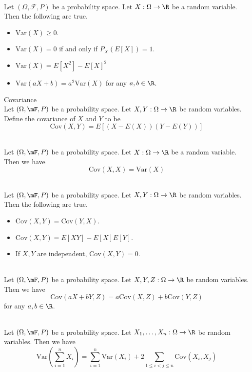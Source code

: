 \documentclass[a4paper]{article}
\begin{document}
\begin{lmm}{}{}\\
Let $(\Omega,\mathcal{F},P)$ be a probability space. Let $X:\Omega\to\R$ be a random variable. Then the following are true. 
\begin{itemize}
\item $\text{Var}(X)\geq 0$. 
\item $\text{Var}(X)=0$ if and only if $P_X(E[X])=1$. 
\item $\text{Var}(X)=E[X^2]-E[X]^2$
\item $\text{Var}(aX+b)=a^2\text{Var}(X)$ for any $a,b\in\R$. 
\end{itemize}
\end{lmm}

\begin{defn}{Covariance}{}\\
Let $(\Omega,\mF,P)$ be a probability space. Let $X,Y:\Omega\to\R$ be random variables. Define the covariance of $X$ and $Y$ to be $$\text{Cov}(X,Y)=E[(X-E(X))(Y-E(Y))]$$
\end{defn}

\begin{lmm}{}{}\\
Let $(\Omega,\mF,P)$ be a probability space. Let $X:\Omega\to\R$ be a random variable. Then we have $$\text{Cov}(X,X)=\text{Var}(X)$$
\end{lmm}

\begin{prp}{}{}\\
Let $(\Omega,\mF,P)$ be a probability space. Let $X,Y:\Omega\to\R$ be random variables. Then the following are true. 
\begin{itemize}
\item $\text{Cov}(X,Y)=\text{Cov}(Y,X)$. 
\item $\text{Cov}(X,Y)=E[XY]-E[X]E[Y]$. 
\item If $X,Y$ are independent, $\text{Cov}(X,Y)=0$. 
\end{itemize}
\end{prp}

\begin{lmm}{}{}\\
Let $(\Omega,\mF,P)$ be a probability space. Let $X,Y,Z:\Omega\to\R$ be random variables. Then we have $$\text{Cov}(aX+bY,Z)=a\text{Cov}(X,Z)+b\text{Cov}(Y,Z)$$ for any $a,b\in\R$. 
\end{lmm}

\begin{prp}{}{}\\
Let $(\Omega,\mF,P)$ be a probability space. Let $X_1,\dots,X_n:\Omega\to\R$ be random variables. Then we have $$\text{Var}\left(\sum_{i=1}^{n}X_i\right)=\sum_{i=1}^n\text{Var}\left(X_i\right)+2\sum_{1\leq i<j\leq n}\text{Cov}\left(X_i,X_j\right)$$
\end{prp}
\end{document}

